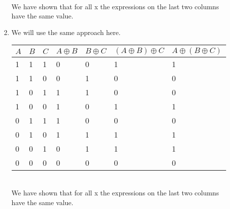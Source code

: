 \documentclass[11pt]{article}
\begin{document}
\begin{enumerate}[label=\textbf{\alph*)}]
\begin{enumerate}[label=(\roman*)]
\begin{tabular}{*7{l}}
		\end{tabular}\\

		We have shown that for all x the expressions on the last two columns have the same value.\newpage
	\item We will use the same approach here.\\

		\begin{tabular}{*7{l}}
			\toprule
			$A$ & $B$ & $C$  & $A\oplus B$ & $B\oplus C$ & $(A\oplus B)\oplus C$ & $A\oplus(B\oplus C)$\\
			\midrule
			1 & 1 & 1 & 0 & 0 & 1 & 1\\
			1 & 1 & 0 & 0 & 1 & 0 & 0\\
			1 & 0 & 1 & 1 & 1 & 0 & 0\\
			1 & 0 & 0 & 1 & 0 & 1 & 1\\
			0 & 1 & 1 & 1 & 0 & 0 & 0\\
			0 & 1 & 0 & 1 & 1 & 1 & 1\\
			0 & 0 & 1 & 0 & 1 & 1 & 1\\
			0 & 0 & 0 & 0 & 0 & 0 & 0\\
			\bottomrule
		\end{tabular}\\

		We have shown that for all x the expressions on the last two columns have the same value.
	\end{enumerate}
	
\end{enumerate}
\end{document}
